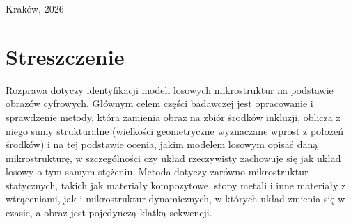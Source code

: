 \documentclass[12pt,a4paper,twoside,openright]{report}
\theoremstyle{definition}
\theoremstyle{remark}
\begin{document}
\begin{titlepage}
    \vfill
    \vspace{1.5cm}
    
    {\fontsize{11}{13}\selectfont Kraków, 2026 \par}
\end{titlepage}

\newpage
\thispagestyle{empty}

\setcounter{page}{2} %

\chapter*{Streszczenie}
Rozprawa dotyczy identyfikacji modeli losowych mikrostruktur na podstawie obrazów cyfrowych. Głównym celem części badawczej jest opracowanie i sprawdzenie metody, która zamienia obraz na zbiór środków inkluzji, oblicza z niego sumy strukturalne (wielkości geometryczne wyznaczane wprost z położeń środków) i na tej podstawie ocenia, jakim modelem losowym opisać daną mikrostrukturę, w szczególności czy układ rzeczywisty zachowuje się jak układ losowy o tym samym stężeniu. Metoda dotyczy zarówno mikrostruktur statycznych, takich jak materiały kompozytowe, stopy metali i inne materiały z wtrąceniami, jak i mikrostruktur dynamicznych, w których układ zmienia się w czasie, a obraz jest pojedynczą klatką sekwencji.
\end{document}
